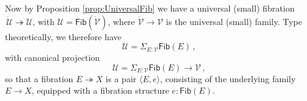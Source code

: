\documentclass[12pt]{article}
\newcommand{\fib}{\ensuremath{\twoheadrightarrow}}
\renewcommand{\to}{\ensuremath{\rightarrow}}
\newcommand{\U}{\ensuremath{\mathcal{U}}}
\newcommand{\UU}{\ensuremath{\,\dot{\mathcal{U}}}}
\newcommand{\V}{\ensuremath{\mathcal{V}}}
\newcommand{\VV}{\ensuremath{\dot{\mathcal{V}}}}
\newcommand{\Fib}{\ensuremath{\mathsf{Fib}}}
\newtheorem{proposition}[theorem]{Proposition}
\theoremstyle{remark}
\theoremstyle{definition}
\newcommand{\pbmark}{\ar[dr, phantom, "\lrcorner" very near start, shift right=.5ex]}	%
\begin{document}
Now by Proposition \ref{prop:UniversalFib} we have a universal (small) fibration $\UU \fib \U$, with $\U = \mathsf{Fib}(\VV)$, where $\VV \to \V$ is the universal (small) family.  Type theoretically, we therefore have
\[
\U = \Sigma_{E:\V}\Fib(E)\,,
\] 
with canonical projection
\[
\U = \Sigma_{E:\V}\Fib(E) \to \V\,,
\] 
so that a fibration $E \fib X$ is a pair $\langle E, e \rangle$, consisting of the underlying family $E\to X$, equipped with a fibration structure $e :\Fib(E)$.
%
\end{document}
